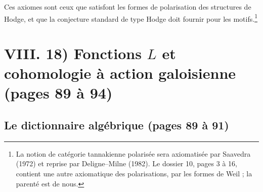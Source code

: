 \documentclass[11pt,a4paper]{article}
\begin{document}
Ces axiomes sont ceux que satisfont les formes de polarisation des structures de
Hodge, et que la conjecture standard de type Hodge doit fournir pour les
motifs.\footnote{La notion de catégorie tannakienne polarisée sera axiomatisée
par Saavedra (1972) et reprise par Deligne--Milne (1982). Le dossier 10, pages 3
à 16, contient une autre axiomatique des polarisations, par les formes de Weil ;
la parenté est de nous.}

\section*{VIII. 18) Fonctions $L$ et cohomologie à action galoisienne (pages 89 à 94)}

\subsection*{Le dictionnaire algébrique (pages 89 à 91)}
\end{document}
